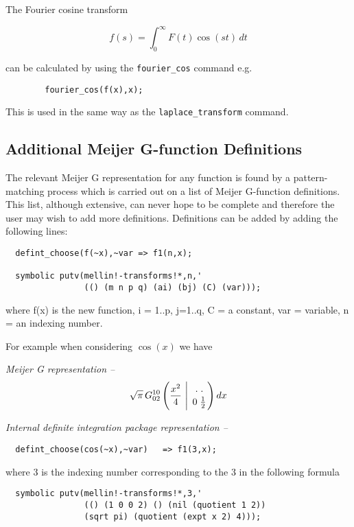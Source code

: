 The Fourier cosine transform

\[
f(s) = \int_{0}^{\infty} F(t) \cos(st) \,dt
\]

can be calculated by using the \verb+fourier_cos+ command e.g.
\begin{verbatim}
        fourier_cos(f(x),x);
\end{verbatim}

This is used in the same way as the \verb+laplace_transform+ command.

\subsection{Additional Meijer G-function Definitions}

The relevant Meijer G representation for any function is found by a
pattern-matching process which is carried out on a list of Meijer
G-function definitions. This list, although extensive, can never hope
to be complete and therefore the user may wish to add more definitions.
Definitions can be added by adding the following lines:

\begin{verbatim}
  defint_choose(f(~x),~var => f1(n,x);

  symbolic putv(mellin!-transforms!*,n,'
                (() (m n p q) (ai) (bj) (C) (var)));

\end{verbatim} 
     where f(x) is the new function, i = 1..p, j=1..q, C = a constant,
     var = variable, n = an indexing number.

For example when considering $\cos(x)$ we have

{\it Meijer G representation --}
\[
\sqrt{\pi} \,G^{1 0}_{0 2}\left(\frac{x^{2}}{4} \ \Bigg\vert
\ \MeijerGparams{ . \; . }{ 0 \; \frac{1}{2}} \right) dx
\]

{\it Internal definite integration package representation --}
\begin{verbatim}
  defint_choose(cos(~x),~var)   => f1(3,x);
\end{verbatim}

where 3 is the indexing number corresponding to the 3
in the following formula

\begin{verbatim}
  symbolic putv(mellin!-transforms!*,3,'
                (() (1 0 0 2) () (nil (quotient 1 2))
                (sqrt pi) (quotient (expt x 2) 4)));
\end{verbatim} 

